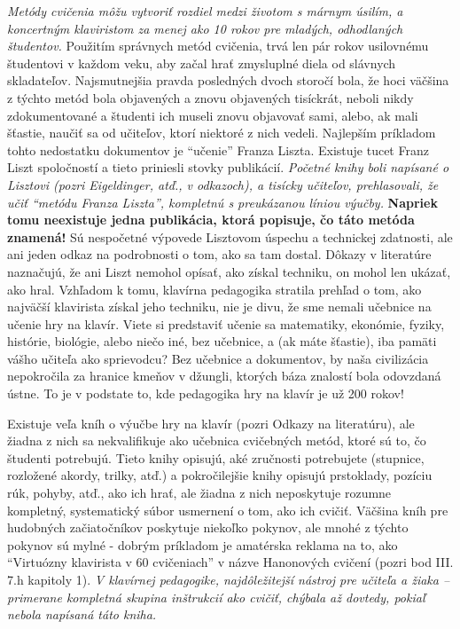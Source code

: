 \emph{Metódy cvičenia môžu vytvoriť rozdiel medzi životom s márnym úsilím, a koncertným klaviristom za menej ako 10 rokov pre mladých, odhodlaných študentov.} Použitím správnych metód cvičenia, trvá len pár rokov usilovnému študentovi v každom veku, aby začal hrať zmysluplné diela od slávnych skladateľov. Najsmutnejšia pravda posledných dvoch storočí bola, že hoci väčšina z týchto metód bola objavených a znovu objavených tisíckrát, neboli nikdy zdokumentované a študenti ich museli znovu objavovať sami, alebo, ak mali šťastie, naučiť sa od učiteľov, ktorí niektoré z nich vedeli. Najlepším príkladom tohto nedostatku dokumentov je “učenie” Franza Liszta. Existuje tucet Franz Liszt spoločností a tieto priniesli stovky publikácií. \emph{Početné knihy boli napísané o Lisztovi (pozri Eigeldinger, atď., v odkazoch), a tisícky učiteľov, prehlasovali, že učiť “metódu Franza Liszta”, kompletnú s preukázanou líniou výučby.} \textbf{Napriek tomu neexistuje jedna publikácia, ktorá popisuje, čo táto metóda znamená!} Sú nespočetné výpovede Lisztovom úspechu a technickej zdatnosti, ale ani jeden odkaz na podrobnosti o tom, ako sa tam dostal. Dôkazy v literatúre naznačujú, že ani Liszt nemohol opísať, ako získal techniku, on mohol len ukázať, ako hral. Vzhľadom k tomu, klavírna pedagogika stratila prehľad o tom, ako najväčší klavirista získal jeho techniku, nie je divu, že sme nemali učebnice na učenie hry na klavír. Viete si predstaviť učenie sa matematiky, ekonómie, fyziky, histórie, biológie, alebo niečo iné, bez učebnice, a (ak máte šťastie), iba pamäti vášho učiteľa ako sprievodcu? Bez učebnice a dokumentov, by naša civilizácia nepokročila za hranice kmeňov v džungli, ktorých báza znalostí bola odovzdaná ústne. To je v podstate to, kde pedagogika hry na klavír je už 200 rokov!

Existuje veľa kníh o výučbe hry na klavír (pozri Odkazy na literatúru), ale žiadna z nich sa nekvalifikuje ako učebnica cvičebných metód, ktoré sú to, čo študenti potrebujú. Tieto knihy opisujú, aké zručnosti potrebujete (stupnice, rozložené akordy, trilky, atď.) a pokročilejšie knihy opisujú prstoklady, pozíciu rúk, pohyby, atď., ako ich hrať, ale žiadna z nich neposkytuje rozumne kompletný, systematický súbor usmernení o tom, ako ich cvičiť. Väčšina kníh pre hudobných začiatočníkov poskytuje niekoľko pokynov, ale mnohé z týchto pokynov sú mylné - dobrým príkladom je amatérska reklama na to, ako “Virtuózny klavirista v 60 cvičeniach” v názve Hanonových cvičení (pozri bod III. 7.h kapitoly 1). \emph{V klavírnej pedagogike, najdôležitejší nástroj pre učiteľa a žiaka – primerane kompletná skupina inštrukcií ako cvičiť, chýbala až dovtedy, pokiaľ nebola napísaná táto kniha.}

